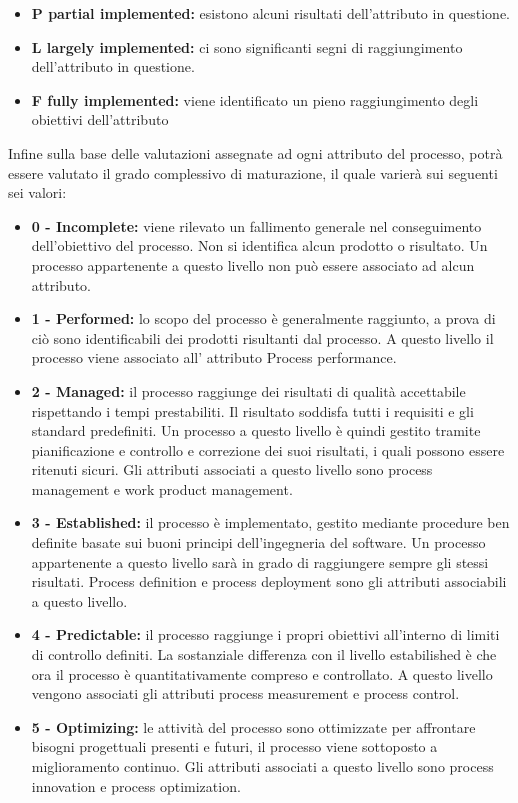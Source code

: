 \documentclass[11pt,a4paper]{article}
\begin{document}
{\begin{itemize}
	\item \textbf{P partial implemented:} esistono alcuni risultati dell'attributo in questione.
	\item \textbf{L largely implemented:} ci sono significanti segni di raggiungimento dell'attributo in questione.
	\item \textbf{F fully implemented:} viene identificato un pieno raggiungimento degli obiettivi dell'attributo
\end{itemize}
Infine sulla base delle valutazioni assegnate ad ogni attributo del processo, potrà essere valutato il grado complessivo di maturazione, il quale varierà sui seguenti sei valori:
\begin{itemize}
	\item \textbf{0 - Incomplete:} viene rilevato un fallimento generale nel conseguimento dell'obiettivo del processo. Non si identifica alcun prodotto o risultato. Un processo appartenente a questo livello non può essere associato ad alcun attributo.
	\item \textbf{1 - Performed:} lo scopo del processo è generalmente raggiunto, a prova di ciò sono identificabili dei prodotti risultanti dal processo. A questo livello il processo viene associato all' attributo Process performance.
	\item \textbf{2 - Managed:} il processo raggiunge dei risultati di qualità accettabile rispettando i tempi prestabiliti. Il risultato soddisfa tutti i requisiti e gli standard predefiniti. Un processo a questo livello è quindi gestito tramite pianificazione e controllo e correzione dei suoi risultati, i quali possono essere ritenuti sicuri. Gli attributi associati a questo livello sono process management e work product management.
	\item \textbf{3 - Established:} il processo è implementato, gestito mediante procedure ben definite basate sui buoni principi dell'ingegneria del software. Un processo appartenente a questo livello sarà in grado di raggiungere sempre gli stessi risultati. Process definition e process deployment sono gli attributi associabili a questo livello.
	\item \textbf{4 - Predictable:} il processo raggiunge i propri obiettivi all'interno di limiti di controllo definiti. La sostanziale differenza con il livello estabilished è che ora il processo è quantitativamente compreso e controllato. A questo livello vengono associati gli attributi process measurement e process control.
	\item \textbf{5 - Optimizing:} le attività del processo sono ottimizzate per affrontare bisogni progettuali presenti e futuri, il processo viene sottoposto a miglioramento continuo. Gli attributi associati a questo livello sono process innovation e process optimization.

\end{itemize}}
\end{document}

